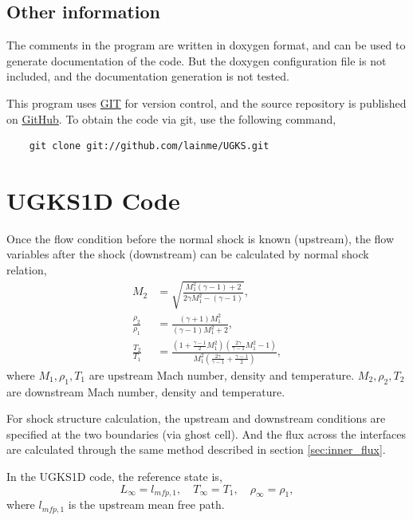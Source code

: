 \documentclass[a4paper]{book}
\begin{document}
\subsection{Other information}
The comments in the program are written in doxygen format, and can be used to generate documentation of the code. But the doxygen configuration file is not included, and the documentation generation is not tested.

This program uses \href{http://git-scm.com/}{GIT} for version control, and the source repository is published on \href{https://github.com/lainme/UGKS}{GitHub}. To obtain the code via git, use the following command,

\begin{verbatim}
    git clone git://github.com/lainme/UGKS.git
\end{verbatim}

\section{UGKS1D Code}
Once the flow condition before the normal shock is known (upstream), the flow variables after the shock (downstream) can be calculated by normal shock relation,
\begin{equation}
    \label{eq:normal_shock}
    \begin{aligned}
        M_2 &= \sqrt{\frac{M_1^2(\gamma-1)+2}{2\gamma M_1^2-(\gamma-1)}},\\
        \frac{\rho_2}{\rho_1} &= \frac{(\gamma+1)M_1^2}{(\gamma-1)M_1^2+2},\\
        \frac{T_2}{T_1} &= \frac{(1+\frac{\gamma-1}{2}M_1^2)(\frac{2\gamma}{\gamma-1}M_1^2-1)}{M_1^2(\frac{2\gamma}{\gamma-1}+\frac{\gamma-1}{2})},
    \end{aligned}
\end{equation}
where $M_1,\rho_1,T_1$ are upstream Mach number, density and temperature. $M_2,\rho_2,T_2$ are downstream Mach number, density and temperature.

For shock structure calculation, the upstream and downstream conditions are specified at the two boundaries (via ghost cell). And the flux across the interfaces are calculated through the same method described in section \ref{sec:inner_flux}.

In the UGKS1D code, the reference state is,
$$L_\infty=l_{mfp,1},\quad T_\infty=T_1,\quad \rho_\infty = \rho_1,$$
where $l_{mfp,1}$ is the upstream mean free path.
\end{document}
